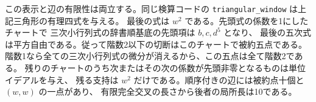 この表示と辺の有限性は両立する。同じ検算コードの
\texttt{triangular\_window} は上記三角形の有理四式を与える。
最後の式は $w^2$ である。先頭式の係数を1にしたチャートで
三次小行列式の辞書順基底の先頭項は $b,c,d^5$ となり、
最後の五次式は平方自由である。従って階数2以下の切断はこのチャートで被約五点である。
階数1なら全ての三次小行列式の微分が消えるから、この五点は全て階数2である。
残りのチャートのうち次またはその次の係数が先頭非零となるものは単位イデアルを与え、
残る支持は $w^2$ だけである。順序付きの辺には被約点十個と $(w,w)$ の一点があり、
有限完全交叉の長さから後者の局所長は10である。
